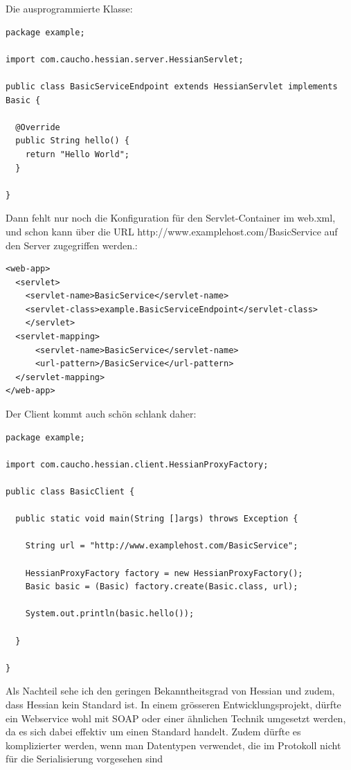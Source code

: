 \documentclass[abstracton, listof=totocnumbered,
bibliography=totocnumbered]{scrreprt}
\begin{document}
  Die ausprogrammierte Klasse:

\begin{verbatim}
package example;  
  
import com.caucho.hessian.server.HessianServlet;

public class BasicServiceEndpoint extends HessianServlet implements Basic {

  @Override
  public String hello() {
    return "Hello World";
  }
      
}
\end{verbatim}

  Dann fehlt nur noch die Konfiguration für den Servlet-Container im web.xml,
  und schon kann über die \ac{URL} http://www.examplehost.com/BasicService auf
  den Server zugegriffen werden.:
  
\begin{verbatim}
<web-app>  
  <servlet>
    <servlet-name>BasicService</servlet-name>
    <servlet-class>example.BasicServiceEndpoint</servlet-class>
    </servlet>
  <servlet-mapping>
      <servlet-name>BasicService</servlet-name>
      <url-pattern>/BasicService</url-pattern>
  </servlet-mapping>
</web-app>
\end{verbatim}

  Der Client kommt auch schön schlank daher:

\begin{verbatim}  
package example;

import com.caucho.hessian.client.HessianProxyFactory;

public class BasicClient {

  public static void main(String []args) throws Exception {
  
    String url = "http://www.examplehost.com/BasicService";

    HessianProxyFactory factory = new HessianProxyFactory();
    Basic basic = (Basic) factory.create(Basic.class, url);

    System.out.println(basic.hello());
    
  }
  
}
\end{verbatim}  
  
  Als Nachteil sehe ich den geringen Bekanntheitsgrad von Hessian und zudem,
  dass Hessian kein Standard ist. In einem grösseren Entwicklungsprojekt, dürfte
  ein Webservice wohl mit \ac{SOAP} oder einer ähnlichen Technik umgesetzt
  werden, da es sich dabei effektiv um einen Standard handelt. Zudem dürfte es
  komplizierter werden, wenn man Datentypen verwendet, die im Protokoll nicht
  für die Serialisierung vorgesehen sind
  
\end{document}
